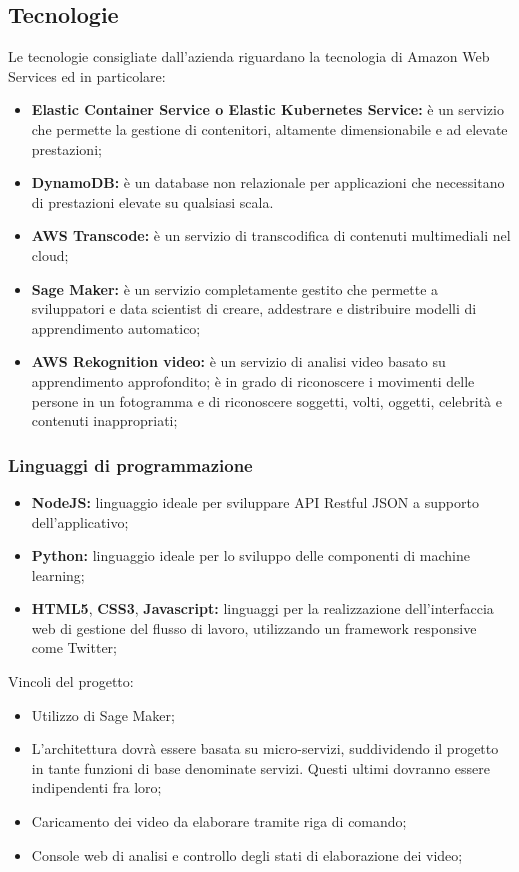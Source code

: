 \documentclass{article}
\begin{document}
    \subsection{Tecnologie}
    Le tecnologie consigliate dall'azienda riguardano la tecnologia di Amazon Web Services ed in particolare:
    \begin{itemize}
        \item \textbf{Elastic Container Service o Elastic Kubernetes Service: }è un servizio che permette la gestione di contenitori, altamente dimensionabile e ad elevate prestazioni;
        \item \textbf{DynamoDB: }è un database non relazionale per applicazioni che necessitano di prestazioni elevate su qualsiasi scala.
        \item \textbf{AWS Transcode: }è un servizio di transcodifica di contenuti multimediali nel cloud;
        \item \textbf{Sage Maker: } è un servizio completamente gestito che permette a sviluppatori e data scientist di creare, addestrare e distribuire modelli di apprendimento automatico;
        \item \textbf{AWS Rekognition video: } è un servizio di analisi video basato su apprendimento approfondito; è in grado di riconoscere i movimenti delle persone in un fotogramma e di riconoscere soggetti, volti, oggetti, celebrità e contenuti inappropriati;
    \end{itemize}
        \subsubsection{Linguaggi di programmazione}
        \begin{itemize}
            \item \textbf{NodeJS: }linguaggio ideale per sviluppare API Restful JSON a supporto dell'applicativo;
            \item \textbf{Python: }linguaggio ideale per lo sviluppo delle componenti di machine learning;
            \item \textbf{HTML5}, \textbf{CSS3}, \textbf{Javascript: }linguaggi per la realizzazione dell'interfaccia web di gestione del flusso di lavoro, utilizzando un framework responsive come Twitter;
        \end{itemize}
    Vincoli del progetto:
    \begin{itemize}
        \item Utilizzo di Sage Maker;
        \item L'architettura dovrà essere basata su micro-servizi, suddividendo il progetto in tante funzioni di base denominate servizi. Questi ultimi dovranno essere indipendenti fra loro;
        \item Caricamento dei video da elaborare tramite riga di comando;
        \item Console web di analisi e controllo degli stati di elaborazione dei video; 
        
        
    \end{itemize}
    
\end{document}
